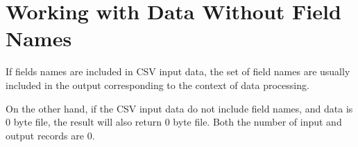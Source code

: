 %

\section{Working with Data Without Field Names\label{sect:nulldata}}

If fields names are included in CSV input data, the set of field names are usually included in the output corresponding to the context of data processing. 

On the other hand, if the CSV input data do not include field names, and data is 0 byte file, the result will also return 0 byte file. Both the number of input and output records are 0.



%


